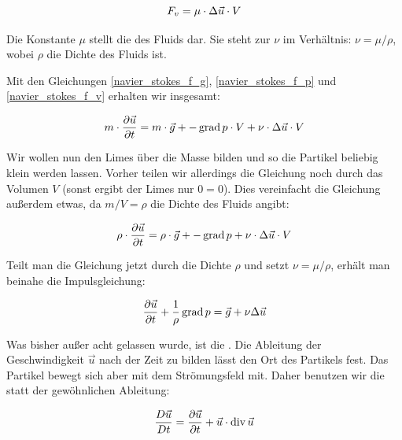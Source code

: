 \begin{equation}
\label{navier_stokes_f_v}
F_v = \mu \cdot \Delta \vec{u} \cdot V
\end{equation}

Die Konstante $\mu$ stellt die  des Fluids
dar. Sie steht zur  $\nu$ im
Verhältnis: $\nu = \mu/\rho$, wobei $\rho$ die Dichte des Fluids ist.

Mit den Gleichungen \ref{navier_stokes_f_g}, \ref{navier_stokes_f_p} und
\ref{navier_stokes_f_v} erhalten wir insgesamt:

\begin{equation}
m \cdot \frac{\partial \vec{u}}{\partial t} = m \cdot \vec{g} + -\operatorname*{grad} p \cdot V + \nu \cdot \Delta \vec{u} \cdot V
\end{equation}

Wir wollen nun den Limes über die Masse bilden und so die Partikel beliebig
klein werden lassen. Vorher teilen wir allerdings die Gleichung noch durch das
Volumen $V$ (sonst ergibt der Limes nur $0=0$). Dies vereinfacht die Gleichung
außerdem etwas, da $m/V = \rho$ die Dichte des Fluids angibt:

\begin{equation}
\rho \cdot \frac{\partial \vec{u}}{\partial t} = \rho \cdot \vec{g} + -\operatorname*{grad} p + \nu \cdot \Delta \vec{u} \cdot V
\end{equation}

Teilt man die Gleichung jetzt durch die Dichte $\rho$ und setzt $\nu =
\mu/\rho$, erhält man beinahe die Impulsgleichung:

\begin{equation}
\label{navier_stokes_pre_impulse_equation}
\frac{
	\partial
	\vec{u}
}
{
	\partial t
} +
\frac{
	1
}
{
	\rho
}
\operatorname*{grad} p =
\vec{g} +
\nu
\Delta
\vec{u}
\end{equation}

Was bisher außer acht gelassen wurde, ist die . Die
Ableitung der Geschwindigkeit $\vec{u}$ nach der Zeit zu bilden lässt den Ort
des Partikels fest. Das Partikel bewegt sich aber mit dem Strömungsfeld mit.
Daher benutzen wir die  statt der
gewöhnlichen Ableitung:

\begin{equation}
\frac{D\vec{u}}{Dt} = \frac{\partial \vec{u}}{\partial t} + \vec{u} \cdot \operatorname*{div} \vec{u}
\end{equation}

